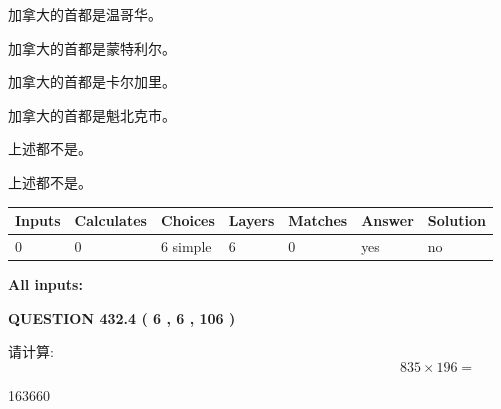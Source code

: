 \documentclass{ctexart}
\begin{document}
 
加拿大的首都是温哥华。
 
 
加拿大的首都是蒙特利尔。
 
 
加拿大的首都是卡尔加里。
 
 
加拿大的首都是魁北克市。
 
 
 上述都不是。
 
 
\noindent{}
 
 
 上述都不是。
 
 
\noindent{}
 
 
   
   
   
   
\noindent\begin{tabular}{|l|l|l|l|l|l|l|}
 \hline
Inputs & Calculates & Choices & Layers & Matches & Answer & Solution \\ \hline
 0  & 
 0  & 
 6
  simple  
  & 
 6  & 
 0  & 
  yes & 
  no 
  \\ \hline
 \end{tabular}
   
   
   
   
\noindent{}
   
   
   
   
\noindent\vspace{0.1in}\hspace{-0.08in} {\textbf{\Large{All inputs: }}}
   
   
  
\vspace{0.2in}
  
{\textbf{\Large{QUESTION
432.4 
 ( 6 , 6 , 106 )
}}}
  
  
 
请计算:
\begin{equation}
835  \times    %
196 = \nonumber
\end{equation}
 
 
 
\noindent{}
 
 

163660
 
\end{document}
